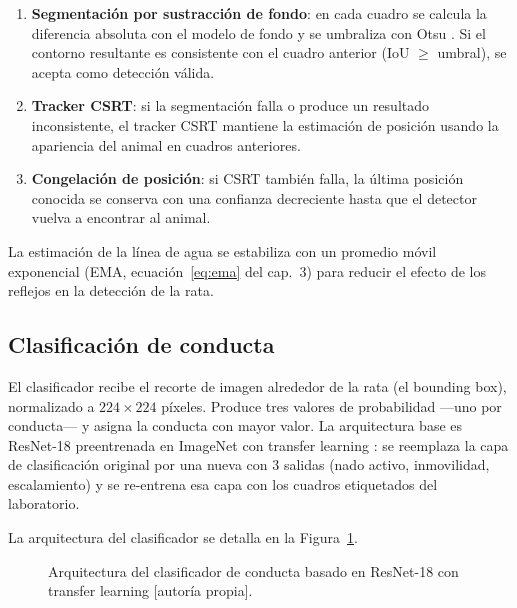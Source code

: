 \begin{enumerate}
  \item \textbf{Segmentación por sustracción de fondo}: en cada cuadro se calcula
        la diferencia absoluta con el modelo de fondo y se umbraliza con Otsu
        \cite{otsu1979}. Si el contorno resultante es consistente con el cuadro
        anterior (IoU $\geq$ umbral), se acepta como detección válida.
  \item \textbf{Tracker CSRT}: si la segmentación falla o produce un resultado
        inconsistente, el tracker CSRT \cite{lukezic2017} mantiene la estimación
        de posición usando la apariencia del animal en cuadros anteriores.
  \item \textbf{Congelación de posición}: si CSRT también falla, la última posición
        conocida se conserva con una confianza decreciente hasta que el detector
        vuelva a encontrar al animal.
\end{enumerate}

La estimación de la línea de agua se estabiliza con un promedio móvil exponencial
(EMA, ecuación~\ref{eq:ema} del cap.~3) para reducir el efecto de los reflejos en la
detección de la rata.

\subsection{Clasificación de conducta}

El clasificador recibe el recorte de imagen alrededor de la rata (el bounding box),
normalizado a $224 \times 224$ píxeles. Produce tres valores de probabilidad ---uno
por conducta--- y asigna la conducta con mayor valor. La arquitectura base es
ResNet-18 preentrenada en ImageNet con transfer learning \cite{he2016,pan2010}:
se reemplaza la capa de clasificación original por una nueva con 3 salidas (nado
activo, inmovilidad, escalamiento) y se re-entrena esa capa con los cuadros
etiquetados del laboratorio.

La arquitectura del clasificador se detalla en la Figura~\ref{fig:clasificador}.

\begin{figure}[ht]
\centering
\caption{Arquitectura del clasificador de conducta basado en ResNet-18 con transfer
learning [autoría propia].}
\label{fig:clasificador}
\end{figure}

